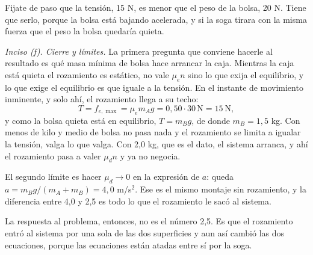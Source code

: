 \documentclass[11pt,openany]{book}
\begin{document}
\begin{ejemplo}[completo]
Fijate de paso que la tensión, 15 N, es menor que el peso de la bolsa, 20 N. Tiene que serlo, porque la bolsa está bajando acelerada, y si la soga tirara con la misma fuerza que el peso la bolsa quedaría quieta.

\medskip
\textit{Inciso (f). Cierre y límites.} La primera pregunta que conviene hacerle al resultado es qué masa mínima de bolsa hace arrancar la caja. Mientras la caja está quieta el rozamiento es estático, no vale $\mu_e n$ sino lo que exija el equilibrio, y lo que exige el equilibrio es que iguale a la tensión. En el instante de movimiento inminente, y solo ahí, el rozamiento llega a su techo:
\[
T = f_{e,\max} = \mu_e m_A g = 0{,}50 \cdot 30\,\mathrm{N} = 15\ \mathrm{N} ,
\]
y como la bolsa quieta está en equilibrio, $T = m_B g$, de donde $m_B = 1{,}5$ kg. Con menos de kilo y medio de bolsa no pasa nada y el rozamiento se limita a igualar la tensión, valga lo que valga. Con 2,0 kg, que es el dato, el sistema arranca, y ahí el rozamiento pasa a valer $\mu_d n$ y ya no negocia.

El segundo límite es hacer $\mu_d \to 0$ en la expresión de $a$: queda $a = m_B g/(m_A+m_B) = 4{,}0$ m/s$^2$. Ese es el mismo montaje sin rozamiento, y la diferencia entre 4,0 y 2,5 es todo lo que el rozamiento le sacó al sistema.

La respuesta al problema, entonces, no es el número 2,5. Es que el rozamiento entró al sistema por una sola de las dos superficies y aun así cambió las dos ecuaciones, porque las ecuaciones están atadas entre sí por la soga.
\end{ejemplo}
\end{document}
